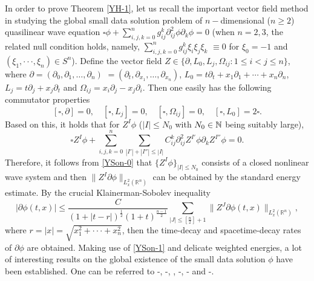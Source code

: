\documentclass[11pt,twoside]{article}
\newcommand{\p}{\partial}
\newcommand{\f}{\frac}
\newcommand{\ds}{\displaystyle}
\theoremstyle{plain}
\theoremstyle{definition}
\theoremstyle{remark}
\numberwithin{equation}{section}
\begin{document}
In order to prove Theorem \ref{YH-1}, let us recall the important vector field method in studying the
global small data solution problem of $n-$dimensional  ($n\ge 2$)  quasilinear wave equation
$\square \phi+\sum_{i,j,k=0}^ng_{ij}^k\p_{ij}^2\phi\p_k\phi=0$
(when $n=2,3$, the related null condition holds, namely, $\sum_{i,j,k=0}^ng_{ij}^k\xi_i\xi_j\xi_k$
$\equiv 0$ for $\xi_0=-1$ and $(\xi_1, \cdot\cdot\cdot, \xi_n)\in S^n$).
Define the vector field $Z\in\{\p, L_0, L_j, \Omega_{i j}:  1\le i<j\le n\}$,
where $\p=(\partial_0, \partial_1, \ldots, \partial_n)$ $=(\partial_t, \partial_{x_1}, \ldots, \partial_{x_n})$, $L_0=t \partial_t+x_1 \partial_1+\cdots+x_n \partial_n$,
$L_j=t\partial_j+x_j \partial_t$ and $\Omega_{i j}=x_i \partial_j-x_j \partial_i$.
Then one easily has the following commutator properties
$$[\square, \p]=0,\quad [\square, L_j]=0, \quad [\square, \Omega_{i j}]=0,\quad [\square, L_0]=2\square.$$
Based on this, it holds that for $Z^I\phi$ ($|I|\le N_0$ with $N_0\in\Bbb N$ being suitably  large),
\begin{equation}\label{YSon-0}
\square Z^I\phi+\sum_{i,j,k=0}^n\sum_{|I'|+|I''|\le|I|}C_{ij}^k\p_{ij}^2Z^{I'}\phi\p_kZ^{I''}\phi=0.
\end{equation}
Therefore, it follows from \eqref{YSon-0} that $\{Z^I\phi\}_{|I|\le N_0}$ consists of a closed nonlinear wave system
and then $\|Z^I\p \phi\|_{L_x^2(\mathbb R^n)}$ can be obtained by the standard energy estimate.
By the crucial Klainerman-Sobolev inequality
\begin{equation}\label{YSon-1}
|\p \phi(t,x)|\le \f{C}{(1+|t-r|)^{\f12}(1+t)^{\f{n-1}{2}}}\ds\sum_{|J|\le [\f{n}{2}]+1}\|Z^J\p \phi(t,x)\|_{L_x^2(\mathbb R^n)},
\end{equation}
where $r=|x|=\sqrt{x_1^2+\cdot\cdot\cdot+x_n^2}$, then the time-decay and spacetime-decay rates of $\p\phi$ are obtained.
Making use of \eqref{YSon-1} and delicate weighted energies,
a lot of interesting results on the global existence of the small data
solution $\phi$ have been established.
One can be referred to \cite{A}-\cite{A3}, \cite{Ding1}-\cite{Ding2}, \cite{H}, \cite{KS}-\cite{KP}, \cite{Li-Chen}-\cite{LX}
and \cite{Lin0}-\cite{Lin2}.
\end{document}
